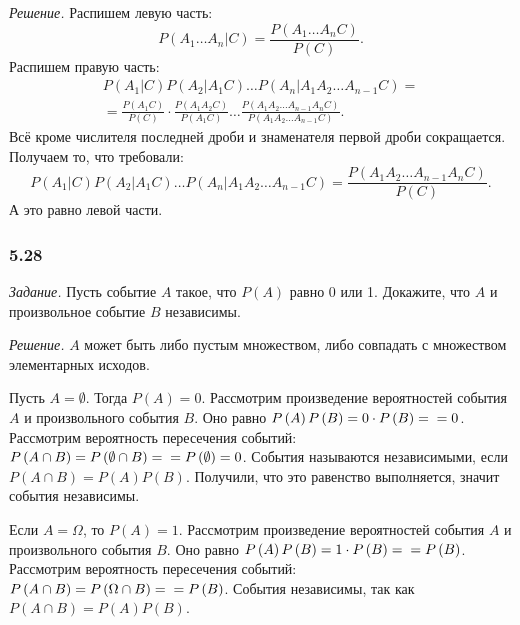\textit{Решение.} Распишем левую часть:
$$P \left( \left. A_1 \dotsc A_n \right| C \right) =
\frac{P \left( A_1 \dotsc A_n C \right) }{P \left( C \right) }.$$
Распишем правую часть:
\begin{equation*}
\begin{split}
P \left( \left. A_1 \right| C \right) P \left( \left. A_2 \right| A_1 C \right) \dotsc
P \left( \left. A_n \right| A_1 A_2 \dotsc A_{n-1} C \right) = \\
= \frac{P \left( A_1 C \right) }{P \left( C \right) } \cdot \frac{P \left( A_1 A_2 C \right) }{P \left( A_1 C \right) } \dotsc
\frac{P \left( A_1 A_2 \dotsc A_{n-1} A_n C \right) }{P \left( A_1 A_2 \dotsc A_{n-1} C \right) }.
\end{split}
\end{equation*}
Всё кроме числителя последней дроби и знаменателя первой дроби сокращается.
Получаем то, что требовали:
$$P \left( \left. A_1 \right| C \right) P \left( \left. A_2 \right| A_1 C \right) \dotsc
P \left( \left. A_n \right| A_1 A_2 \dotsc A_{n-1} C \right) =
\frac{P \left( A_1 A_2 \dotsc A_{n-1} A_n C \right) }{P \left( C \right) }.$$
А это равно левой части.

\subsubsection*{5.28}

\textit{Задание.} Пусть событие $A$ такое, что $P \left( A \right) $ равно 0 или 1.
Докажите, что $A$ и произвольное событие $B$ независимы.

\textit{Решение.} $A$ может быть либо пустым множеством, либо совпадать с множеством элементарных исходов.

Пусть $A = \emptyset$.
Тогда $P \left( A \right) = 0$.
Рассмотрим произведение вероятностей события $A$ и произвольного события $B$.
Оно равно $P \left( A \right) P \left( B \right) = 0 \cdot P \left( B \right) = \\ = 0$.
Рассмотрим вероятность пересечения событий: $P \left( A \cap B \right) = P \left( \emptyset \cap B \right) = \\ = P \left( \emptyset \right) = 0$.
События называются независимыми, если $P \left( A \cap B \right) = P \left( A \right) P \left( B \right) $.
Получили, что это равенство выполняется, значит события независимы.

Если $A = \Omega $, то $P \left( A \right) = 1$.
Рассмотрим произведение вероятностей события $A$ и произвольного события $B$.
Оно равно $P \left( A \right) P \left( B \right) = 1 \cdot P \left( B \right) = \\ = P \left( B \right)$.
Рассмотрим вероятность пересечения событий: $P \left( A \cap B \right) = P \left( \Omega \cap B \right) = \\ = P \left( B \right) $.
События независимы, так как $P \left( A \cap B \right) = P \left( A \right) P \left( B \right) $.
